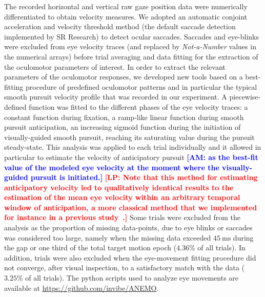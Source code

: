 \documentclass[10pt,letterpaper]{article}
\newcommand{\ms}{\si{\milli\second}}%
\newcommand{\LP}[1]{\textbf{\textcolor{red}{[LP: #1]}}}
\newcommand{\AM}[1]{\textbf{\textcolor{blue}{[AM: #1]}}}
\begin{document}
The recorded horizontal and vertical raw gaze position data were numerically differentiated to obtain velocity measures. We adopted an automatic conjoint acceleration and velocity threshold method (the default saccade detection implemented by SR Research) to detect ocular saccades. Saccades and eye-blinks were excluded from eye velocity traces (and replaced by \textit{Not-a-Number} values in the numerical arrays) before trial averaging and data fitting for the extraction of the oculomotor parameters of interest.
In order to extract the relevant parameters of the oculomotor responses, we developed new tools based on a best-fitting procedure of predefined oculomotor patterns and in particular the typical smooth pursuit velocity profile that was recorded in our experiment. A piecewise-defined function was fitted to the different phases of the eye velocity traces: a constant function during fixation, a ramp-like linear function during smooth pursuit anticipation, an increasing sigmoid function during the initiation of visually-guided smooth pursuit, reaching its saturating value during the pursuit steady-state. This analysis was applied to each trial individually and it allowed in particular to estimate the velocity of anticipatory pursuit  \AM{as the best-fit value of the modeled eye velocity at the moment where the visually-guided pursuit is initiated.} \LP{Note that this method for estimating anticipatory velocity led to qualitatively identical results to the estimation of the mean eye velocity within an arbitrary temporal window of anticipation, a more classical method that we implemented for instance in a previous study~\cite{Damasse18}.}  Some trials were excluded from the analysis as the proportion of missing data-points, due to eye blinks or saccades was considered too large, namely when the missing data exceeded $45~\ms$ during the gap or one third of the total target motion epoch ($4.36\%$ of all trials). In addition, trials were also excluded when the eye-movement fitting procedure did not converge, after visual inspection, to a satisfactory match with the data ($3.25\%$ of all trials). The python scripts used to analyze eye movements are available at \url{https://github.com/invibe/ANEMO}.
\end{document}
